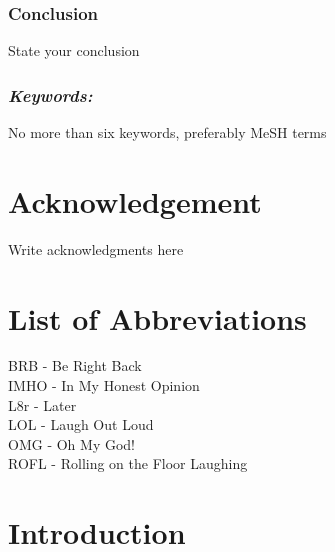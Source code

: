 \documentclass[11pt]{report}
\begin{document}
\subsection*{Conclusion}
State your conclusion

\subsection*{\emph{Keywords:}} No more than six keywords, preferably MeSH terms


\chapter*{Acknowledgement}
\thispagestyle{empty}
Write acknowledgments here

\tableofcontents
\setcounter{page}{1}
\thispagestyle{plain}



\chapter*{List of Abbreviations}

BRB - Be Right Back\\
IMHO - In My Honest Opinion\\
L8r - Later\\
LOL - Laugh Out Loud\\
OMG - Oh My God!\\
ROFL - Rolling on the Floor Laughing

\listoffigures
\thispagestyle{plain}

\listoftables
\thispagestyle{plain}


\chapter{Introduction}
\setcounter{page}{1}
\end{document}
